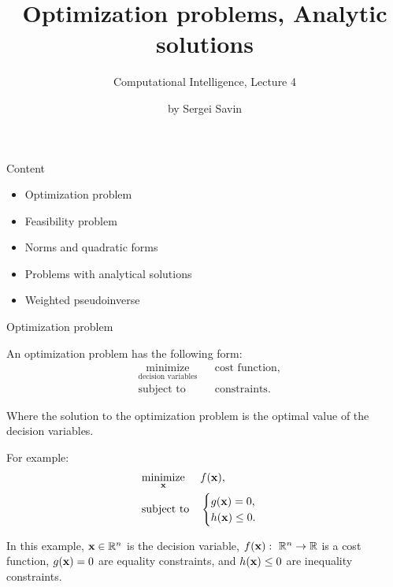 \documentclass{beamer}
\title{Optimization problems, Analytic solutions}
\subtitle{Computational Intelligence, Lecture 4}
\author{by Sergei Savin}
\date{\mydate}
\begin{document}
\maketitle


\begin{frame}{Content}

\begin{itemize}
\item Optimization problem
\item Feasibility problem
\item Norms and quadratic forms
\item Problems with analytical solutions
\item Weighted pseudoinverse
\end{itemize}

\end{frame}




\begin{frame}{Optimization problem}
	\begin{flushleft}
		
		An optimization problem has the following form:
		\begin{equation}
			\begin{aligned}
				& \underset{\text{decision variables}}{\text{minimize}}
				& & \text{cost function}, \\
				& \text{subject to}
				& & \text{constraints}.
			\end{aligned}
		\end{equation}
	
		Where the solution to the optimization problem is the optimal value of the decision variables.
		
		\bigskip
		
		For example:
		\begin{equation}
			\begin{aligned}
				& \underset{\mathbf{x}}{\text{minimize}}
				& & f(\mathbf{x}), \\
				& \text{subject to}
				& & \begin{cases}
					g(\mathbf{x}) = 0, \\
					h(\mathbf{x}) \leq 0.
				\end{cases}
			\end{aligned}
		\end{equation}
	
	In this example, $\mathbf{x} \in \mathbb{R}^n$ is the decision variable, $f(\mathbf{x}): \ \mathbb{R}^n \rightarrow \mathbb{R}$ is a cost function, $g(\mathbf{x}) = 0$ are equality constraints, and $h(\mathbf{x}) \leq 0$ are inequality constraints.

	\end{flushleft}
\end{frame}
\end{document}
